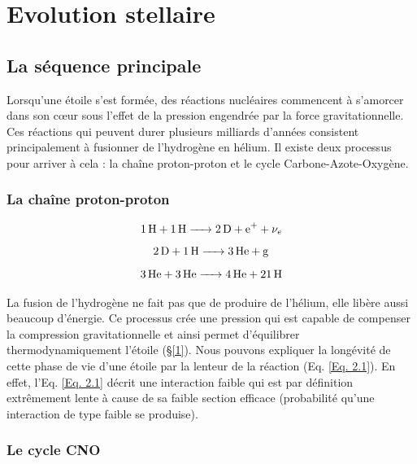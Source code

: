 

	
\chapter{Evolution stellaire}\label{2}

\section{La séquence principale}\label{2.1}

Lorsqu’une étoile s’est formée, des réactions nucléaires commencent à s’amorcer dans son cœur sous l’effet de la pression engendrée par la force gravitationnelle. Ces réactions qui peuvent durer plusieurs milliards d’années consistent principalement à fusionner de l’hydrogène en hélium. Il existe deux processus pour arriver à cela : la chaîne proton-proton et le cycle Carbone-Azote-Oxygène.

\subsection{La chaîne proton-proton}\label{2.1.1}


\begin{equation}\ce{\ce{1H} + \ce{1H} -> \ce{2D} + \ce{e+} + $\nu_{e}$}\label{Eq. 2.1}\end{equation}
\begin{equation}\ce{\ce{2D} + \ce{1H} -> \ce{3He} + g}\label{Eq. 2.2}\end{equation}
\begin{equation}\ce{\ce{3He} + \ce{3He} -> \ce{4He} + \ce{21H}}\label{Eq. 2.3}\end{equation}\smallskip	


La fusion de l’hydrogène ne fait pas que de produire de l’hélium, elle libère aussi beaucoup d’énergie. Ce processus crée une pression qui est capable de compenser la compression gravitationnelle et ainsi permet d’équilibrer thermodynamiquement l’étoile (§\ref{1}).
Nous pouvons expliquer la longévité de cette phase de vie d’une étoile par la lenteur de la réaction (Eq. \ref{Eq. 2.1}). En effet, l’Eq. \ref{Eq. 2.1} décrit une interaction faible qui est par définition extrêmement lente à cause de sa faible section efficace (probabilité qu’une interaction de type faible se produise).

\subsection{Le cycle CNO}\label{2.1.2}

